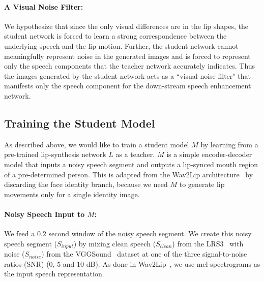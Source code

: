 \documentclass[10pt,twocolumn,letterpaper]{article}
\begin{document}
\vspace{-10pt}
\paragraph{A Visual Noise Filter:} We hypothesize that since the only visual differences are in the lip shapes, the student network is forced to learn a strong correspondence between the underlying speech and the lip motion. Further, the student network cannot meaningfully represent noise in the generated images and is forced to represent only the speech components that the teacher network accurately indicates. Thus the images generated by the student network acts as a ``visual noise filter" that manifests only the speech component for the down-stream speech enhancement network.

\subsection{Training the Student Model}
\label{subsection:step2}
As described above, we would like to train a student model $M$ by learning from a pre-trained lip-synthesis network $L$ as a teacher. $M$ is a simple encoder-decoder model that inputs a noisy speech segment and outputs a lip-synced mouth region of a pre-determined person. This is adapted from the Wav2Lip architecture~\cite{wav2lip:2020} by discarding the face identity branch, because we need $M$ to generate lip movements only for a single identity image.

\paragraph{Noisy Speech Input to $M$:} We feed a $0.2$ second window of the noisy speech segment. We create this noisy speech segment ($S_{input}$) by mixing clean speech ($S_{clean}$) from the LRS3~\cite{Afouras18d} with noise ($S_{noise}$) from the VGGSound~\cite{9053174} dataset at one of the three signal-to-noise ratios (SNR) ($0$, $5$ and $10$ dB). As done in Wav2Lip~\cite{wav2lip:2020}, we use mel-spectrograms as the input speech representation. 
\end{document}
